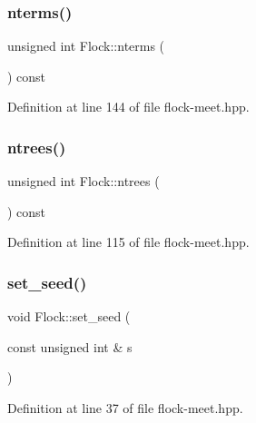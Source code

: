 \mbox{\label{class_flock_a06498d9641893889d1387ff6fe70bcea}} 
\subsubsection{\texorpdfstring{nterms()}{nterms()}}
{\footnotesize\ttfamily unsigned int Flock\+::nterms (\begin{DoxyParamCaption}{ }\end{DoxyParamCaption}) const\hspace{0.3cm}{\ttfamily [inline]}}



Definition at line 144 of file flock-\/meet.\+hpp.

\mbox{\label{class_flock_acc0c7259a4b3e59f858e79c454cfb8f7}} 
\subsubsection{\texorpdfstring{ntrees()}{ntrees()}}
{\footnotesize\ttfamily unsigned int Flock\+::ntrees (\begin{DoxyParamCaption}{ }\end{DoxyParamCaption}) const\hspace{0.3cm}{\ttfamily [inline]}}



Definition at line 115 of file flock-\/meet.\+hpp.

\mbox{\label{class_flock_acfa9efc24a1ff2f0f31206570da51259}} 
\subsubsection{\texorpdfstring{set\+\_\+seed()}{set\_seed()}}
{\footnotesize\ttfamily void Flock\+::set\+\_\+seed (\begin{DoxyParamCaption}\item[{const unsigned int \&}]{s }\end{DoxyParamCaption})\hspace{0.3cm}{\ttfamily [inline]}}



Definition at line 37 of file flock-\/meet.\+hpp.



